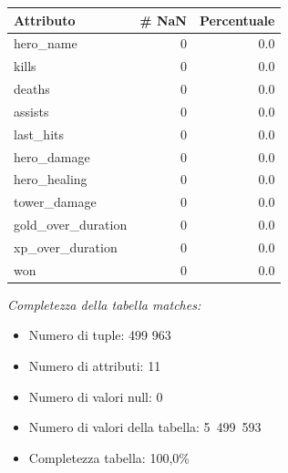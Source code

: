 \documentclass[a4paper,12pt,openany,oneside]{book}
\begin{document}
\begin{table}[!h]
	\scriptsize	
	\centering	
	\begin{tabularx}{0.37\textwidth}{lrr} 
		Attributo      &   \# NaN   &     Percentuale \\
		\midrule
		hero\_name      &       0   &    0.0 \\
		kills   &       0   &    0.0 \\
		deaths       &       0   &    0.0 \\
		assists          &       0   &    0.0 \\
		last\_hits    &       0   &    0.0 \\
		hero\_damage      &      0   &    0.0 \\
		hero\_healing       &    0   &    0.0 \\
		tower\_damage     &  0   &   0.0 \\
		gold\_over\_duration      &   0   &    0.0 \\
		xp\_over\_duration         &       0   &    0.0 \\
		won        &       0   &    0.0 \\
	\end{tabularx}
\end{table}
\textit{Completezza della tabella matches:}\\
\begin{itemize}
	\item Numero di tuple: 499 963
	\item Numero di attributi: 11
	\item Numero di valori null: 0
	\item Numero di valori della tabella: 5 499 593
	\item Completezza tabella: 100,0\%
\end{itemize}
\end{document}
